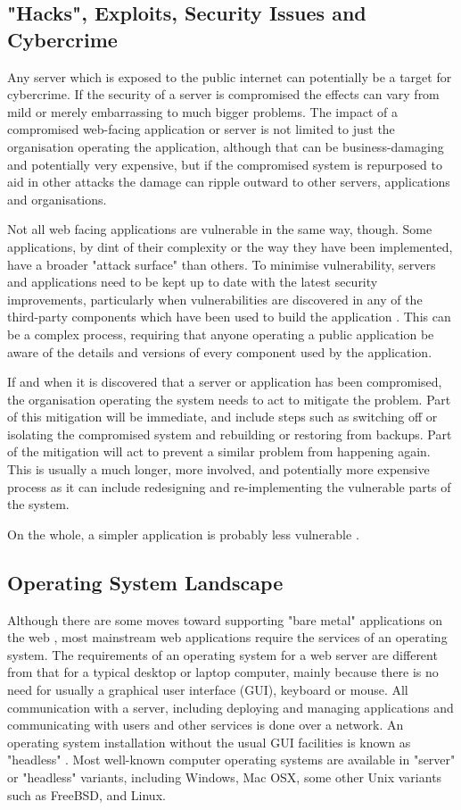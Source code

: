 \subsection{"Hacks", Exploits, Security Issues and Cybercrime}

Any server which is exposed to the public internet can potentially be a target for cybercrime. If the security of a server is compromised the effects can vary from mild or merely embarrassing to much bigger problems. The impact of a compromised web-facing application or server is not limited to just the organisation operating the application, although that can be business-damaging and potentially very expensive, but if the compromised system is repurposed to aid in other attacks the damage can ripple outward to other servers, applications and organisations.

Not all web facing applications are vulnerable in the same way, though. Some applications, by dint of their complexity or the way they have been implemented, have a broader "attack surface"  than others. To minimise vulnerability, servers and applications need to be kept up to date with the latest security improvements, particularly when vulnerabilities are discovered in any of the third-party components which have been used to build the application . This can be a complex process, requiring that anyone operating a public application be aware of the details and versions of every component used by the application.

If and when it is discovered that a server or application has been compromised, the organisation operating the system needs to act to mitigate the problem. Part of this mitigation will be immediate, and include steps such as switching off or isolating the compromised system and rebuilding or restoring from backups. Part of the mitigation will act to prevent a similar problem from happening again. This is usually a much longer, more involved, and potentially more expensive process as it can include redesigning and re-implementing the vulnerable parts of the system.

On the whole, a simpler application is probably less vulnerable .

\subsection{Operating System Landscape}
Although there are some moves toward supporting "bare metal" applications on the web , most mainstream web applications require the services of an operating system. The requirements of an operating system for a web server are different from that for a typical desktop or laptop computer, mainly because there is no need for usually a graphical user interface (GUI), keyboard or mouse. All communication with a server, including deploying and managing applications and communicating with users and other services is done over a network. An operating system installation without the usual GUI facilities is known as "headless" . Most well-known computer operating systems are available in "server" or "headless" variants, including Windows, Mac OSX, some other Unix variants such as FreeBSD, and Linux.

